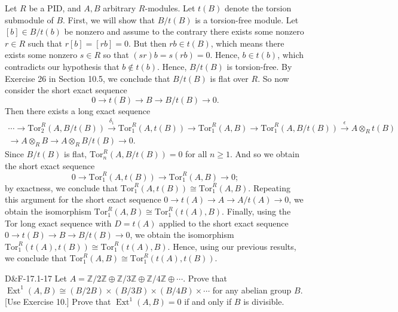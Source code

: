 \documentclass{article}
\newcommand{\tor}{\text{Tor}}
\begin{document}
	Let $R$ be a PID, and $A, B$ arbitrary $R$-modules. Let $t(B)$ denote the torsion submodule of $B$. First, we will show that $B/t(B)$ is a torsion-free module. Let $[b] \in B/t(b)$ be nonzero and assume to the contrary there exists some nonzero $r \in R$ such that $r[b] = [rb] = 0$. But then $rb \in t(B)$, which means there exists some nonzero $s \in R$ so that $(sr)b = s(rb) = 0$. Hence, $b \in t(b)$, which contradicts our hypothesis that $b\notin t(b)$. Hence, $B/t(B)$ is torsion-free. By Exercise 26 in Section 10.5, we conclude that $B/t(B)$ is flat over $R$. So now consider the short exact sequence 
	\begin{equation*}
		0 \to t(B) \to B \to B/t(B) \to 0. 
	\end{equation*}
	Then there exists a long exact sequence 
	\begin{multline*}
		\dotsm \to \tor_{2}^{R}(A, B/t(B)) \xrightarrow{\delta_{1}} \tor_{1}^{R}(A, t(B)) \to \tor_{1}^{R}(A, B) \to \tor_{1}^{R}(A, B/t(B)) \xrightarrow{\epsilon} A \otimes_{R} t(B) \\ \to A \otimes_{R} B \to A\otimes_{R} B/t(B) \to 0.
	\end{multline*}
	Since $B/t(B)$ is flat, $\tor_{n}^{R}(A, B/t(B)) = 0$ for all $n \geq 1$. And so we obtain the short exact sequence 
	\begin{equation*}
		0 \to \tor_{1}^{R}(A, t(B)) \to \tor_{1}^{R}(A, B) \to 0; 
	\end{equation*}
	by exactness, we conclude that $\tor_{1}^{R}(A, t(B)) \cong \tor_{1}^{R}(A, B)$. Repeating this argument for the short exact sequence $0 \to t(A)  \to A \to A/t(A) \to 0$, we obtain the isomorphism $\tor_{1}^{R}(A,B) \cong \tor_{1}^{R}(t(A),B)$. Finally, using the Tor long exact sequence with $D = t(A)$ applied to the short exact sequence $0 \to t(B) \to B \to B/t(B) \to 0$, we obtain the isomorphism $\tor_{1}^{R}(t(A),t(B)) \cong \tor_{1}^{R}(t(A),B)$. Hence, using our previous results, we conclude that $\tor_{1}^{R}(A,B) \cong \tor_{1}^{R}(t(A),t(B))$. 
	
	\begin{prb}{D\&F-17.1-17}
		Let $A = \mathbb{Z}/2\mathbb{Z} \oplus \mathbb{Z}/3\mathbb{Z} \oplus \mathbb{Z}/4\mathbb{Z} \oplus \dotsm$. Prove that $\operatorname{Ext}^{1}(A, B) \cong (B/2B) \times (B/3B) \times (B/4B) \times \dotsm$ for any abelian group $B$. [Use Exercise 10.] Prove that $\operatorname{Ext}^{1}(A, B) =0$ if and only if $B$ is divisible. 
	\end{prb}
	
\end{document}
